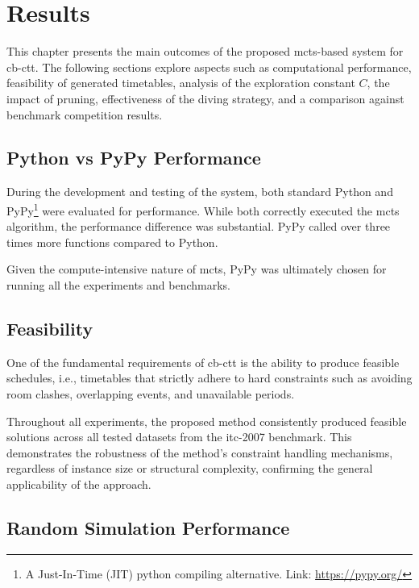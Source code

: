 \chapter{Results}

\label{Results}

This chapter presents the main outcomes of the proposed \ac{mcts}-based system for \ac{cb-ctt}. The following sections explore aspects such as computational performance, feasibility of generated timetables, analysis of the exploration constant \(C\), the impact of pruning, effectiveness of the diving strategy, and a comparison against benchmark competition results.

\section{Python vs PyPy Performance}

During the development and testing of the system, both standard Python and PyPy\footnote{A Just-In-Time (JIT) python compiling alternative. Link: \url{https://pypy.org/}} were evaluated for performance. While both correctly executed the \ac{mcts} algorithm, the performance difference was substantial. PyPy called over three times more functions compared to Python.

Given the compute-intensive nature of \ac{mcts}, PyPy was ultimately chosen for running all the experiments and benchmarks.

\section{Feasibility}

One of the fundamental requirements of \ac{cb-ctt} is the ability to produce feasible schedules, i.e., timetables that strictly adhere to hard constraints such as avoiding room clashes, overlapping events, and unavailable periods.

Throughout all experiments, the proposed method consistently produced feasible solutions across all tested datasets from the \ac{itc-2007} benchmark. This demonstrates the robustness of the method's constraint handling mechanisms, regardless of instance size or structural complexity, confirming the general applicability of the approach.

\section{Random Simulation Performance}

